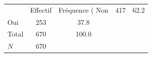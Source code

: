 {
\def\sym#1{\ifmmode^{#1}\else\(^{#1}\)\fi}
\begin{tabular}{l*{1}{cc}}
\toprule
            &    Effectif&Fréquence (%
\midrule
Non         &         417&        62.2\\
Oui         &         253&        37.8\\
Total       &         670&       100.0\\
\midrule
\(N\)       &         670&            \\
\bottomrule
\end{tabular}
}
